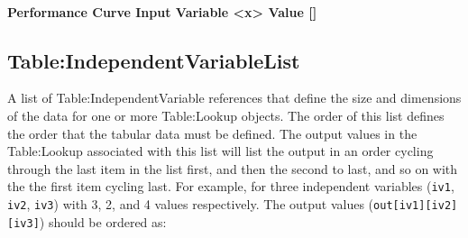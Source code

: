\paragraph{Performance Curve Input Variable
\textless{}x\textgreater{} Value
{[}{]}}\label{performance-curve-input-variable-x-value}

\subsection{Table:IndependentVariableList}\label{tableindependentvariablelist}

A list of Table:IndependentVariable references that define the size and
dimensions of the data for one or more Table:Lookup objects. The order
of this list defines the order that the tabular data must be defined.
The output values in the Table:Lookup associated with this list will
list the output in an order cycling through the last item in the list
first, and then the second to last, and so on with the the first item
cycling last. For example, for three independent variables
(\texttt{iv1}, \texttt{iv2}, \texttt{iv3}) with 3, 2, and 4 values
respectively. The output values
(\texttt{out{[}iv1{]}{[}iv2{]}{[}iv3{]}}) should be ordered as:


